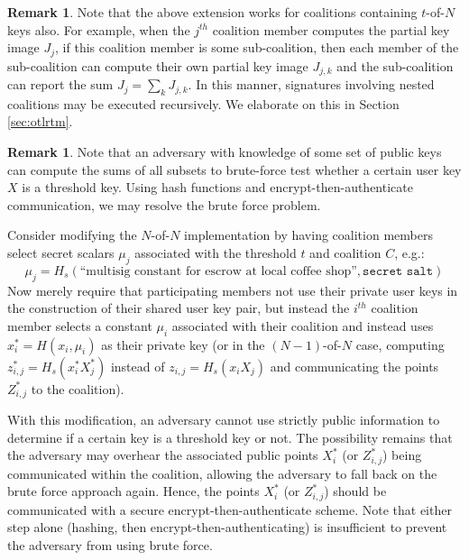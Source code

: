 \documentclass{mrl}
\theoremstyle{definition}
\newtheorem{disc}[theorem]{Remark}
\begin{document}
\begin{disc}\label{remark:recursion}
Note that the above extension works for coalitions containing $t$-of-$N$ keys also. For example, when the $j^{th}$ coalition member computes the partial key image $J_j$, if this coalition member is some sub-coalition, then each member of the sub-coalition can compute their own partial key image $J_{j,k}$ and the sub-coalition can report the sum $J_j = \sum_k J_{j,k}$. In this manner, signatures involving nested coalitions may be executed recursively. We elaborate on this in Section \ref{sec:otlrtm}.
\end{disc}

\begin{disc}\label{hashed-keys}
Note that an adversary with knowledge of some set of public keys can compute the sums of all subsets to brute-force test whether a certain user key $X$ is a threshold key. Using hash functions and encrypt-then-authenticate communication, we may resolve the brute force problem. 

Consider modifying the $N$-of-$N$ implementation by having coalition members select secret scalars $\mu_j$ associated with the threshold $t$ and coalition $C$, e.g.:
\[\mu_j = H_s(\text{``multisig constant for escrow at local coffee shop''}, \texttt{secret salt})\] 
Now merely require that participating members not use their private user keys in the construction of their shared user key pair, but instead the $i^{th}$ coalition member selects a constant $\mu_i$ associated with their coalition and instead uses $x^*_i = H(x_i, \mu_i)$ as their private key (or in the $(N-1)$-of-$N$ case, computing $z^*_{i,j} = H_s(x_i^* X_j^*)$ instead of $z_{i,j} = H_s(x_i X_j)$ and communicating the points $Z^*_{i,j}$ to the coalition).

With this modification, an adversary cannot use strictly public information to determine if a certain key is a threshold key or not. The possibility remains that the adversary may overhear the associated public points $X^*_i$ (or $Z^*_{i,j}$) being communicated within the coalition, allowing the adversary to fall back on the brute force approach again. Hence, the points $X^*_i$ (or $Z^*_{i,j}$) should be communicated with a secure encrypt-then-authenticate scheme. Note that either step alone (hashing, then encrypt-then-authenticating) is insufficient to prevent the adversary from using brute force.
\end{disc}
\end{document}
